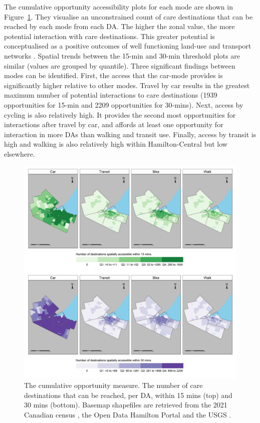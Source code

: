 \documentclass[
  authoryear,
  preprint,
  3p]{elsarticle}
\begin{document}
The cumulative opportunity accessibility plots for each mode are shown
in Figure~\ref{fig-Fig5}. They visualise an unconstrained count of care
destinations that can be reached by each mode from each DA. The higher
the zonal value, the more potential interaction with care destinations.
This greater potential is conceptualised as a positive outcomes of well
functioning land-use and transport networks
\citep{corderaImpactAccessibilityPublic2019, blumenbergDriveWorkRelationship2017, cuiSpatialAccessPublic2020}.
Spatial trends between the 15-min and 30-min threshold plots are similar
(values are grouped by quantile). Three significant findings between
modes can be identified. First, the access that the car-mode provides is
significantly higher relative to other modes. Travel by car results in
the greatest maximum number of potential interactions to care
destinations (1939 opportunities for 15-min and 2209 opportunities for
30-mins). Next, access by cycling is also relatively high. It provides
the second most opportunities for interactions after travel by car, and
affords at least one opportunity for interaction in more DAs than
walking and transit use. Finally, access by transit is high and walking
is also relatively high within Hamilton-Central but low elsewhere.

\begin{figure}

{\centering \includegraphics[width=6.25in,height=\textheight]{figures/Fig5-plot_cum_opp_measures.png}

}

\caption{\label{fig-Fig5}The cumulative opportunity measure. The number
of care destinations that can be reached, per DA, within 15 mins (top)
and 30 mins (bottom). Basemap shapefiles are retrieved from the 2021
Canadian census \citep{governmentofcanadaCensusPopulation2023}, the Open
Data Hamilton Portal \citep{opendatahamiltonCityBoundary2023} and the
USGS \citep{greatlakesUSGS2010}.}

\end{figure}
\end{document}
